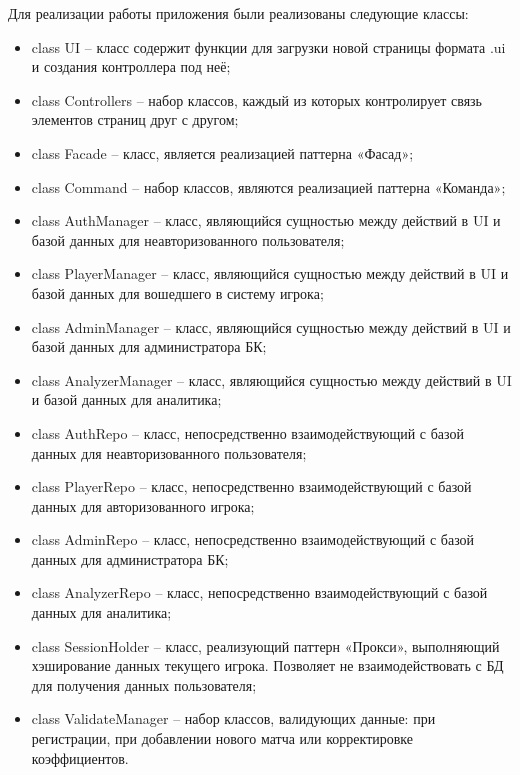 Для реализации работы приложения были реализованы следующие классы:
\begin{itemize}
	\item class UI -- класс содержит функции для загрузки новой страницы формата .ui и создания контроллера под неё;
	\item class Controllers -- набор классов, каждый из которых контролирует связь элементов страниц друг с другом;
	\item class Facade -- класс, является реализацией паттерна «Фасад»;
	\item class Command -- набор классов, являются реализацией паттерна «Команда»;
	\item class AuthManager -- класс, являющийся сущностью между действий в UI и базой данных для неавторизованного пользователя;
	\item class PlayerManager -- класс, являющийся сущностью между действий в UI и базой данных для вошедшего в систему игрока;
	\item class AdminManager -- класс, являющийся сущностью между действий в UI и базой данных для администратора БК;
	\item class AnalyzerManager -- класс, являющийся сущностью между действий в UI и базой данных для аналитика;
	\item class AuthRepo -- класс, непосредственно взаимодействующий с базой данных для неавторизованного пользователя; 
	\item class PlayerRepo -- класс, непосредственно взаимодействующий с базой данных для авторизованного игрока; 
	\item class AdminRepo -- класс, непосредственно взаимодействующий с базой данных для администратора БК; 
	\item class AnalyzerRepo -- класс, непосредственно взаимодействующий с базой данных для аналитика; 
	\item class SessionHolder -- класс, реализующий паттерн «Прокси», выполняющий хэширование данных текущего игрока. Позволяет не взаимодействовать с БД для получения данных пользователя;
	\item class ValidateManager -- набор классов, валидующих данные: при регистрации, при добавлении нового матча или корректировке коэффициентов.
\end{itemize}

